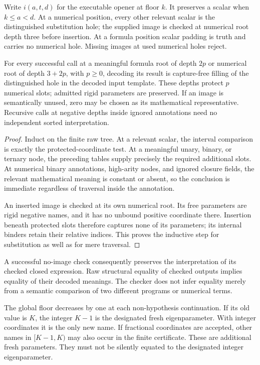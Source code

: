 Write $i(a,t,d)$ for the executable opener at floor $k$.  It preserves a
scalar when $k\leq a<d$.  At a numerical position, every other relevant
scalar is the distinguished substitution hole; the supplied image is
checked at numerical root depth three before insertion.  At a formula
position scalar padding is truth and carries no numerical hole.
Missing images at used numerical holes reject.

\begin{lemma}
\label{lem:semantic-opening}
For every successful call at a meaningful formula root of depth $2p$
or numerical root of depth $3+2p$, with $p\geq0$, decoding its result
is capture-free filling of the distinguished hole in the decoded input
template.  These depths protect $p$ numerical slots; admitted rigid
parameters are preserved.  If an image is semantically unused, zero
may be chosen as its mathematical representative.  Recursive calls
at negative depths inside ignored annotations need no independent
sorted interpretation.
\end{lemma}

\begin{proof}
Induct on the finite raw tree.  At a relevant scalar, the interval
comparison is exactly the protected-coordinate test.  At a meaningful
unary, binary, or ternary node, the preceding tables supply precisely
the required additional slots.  At numerical binary annotations,
high-arity nodes, and ignored closure fields, the relevant mathematical
meaning is constant or absent, so the conclusion is immediate
regardless of traversal inside the annotation.

An inserted image is checked at its own numerical root.  Its free
parameters are rigid negative names, and it has no unbound positive
coordinate there.  Insertion beneath protected slots therefore captures
none of its parameters; its internal binders retain their relative
indices.  This proves the inductive step for substitution as well as
for mere traversal.
\end{proof}

A successful no-image check consequently preserves the interpretation
of its checked closed expression.  Raw structural equality of checked
outputs implies equality of their decoded meanings.  The checker does
not infer equality merely from a semantic comparison of two different
programs or numerical terms.

The global floor decreases by one at each non-hypothesis continuation.
If its old value is $K$, the integer $K-1$ is the designated fresh
eigenparameter.  With integer coordinates it is the only new name.
If fractional coordinates are accepted, other names in $[K-1,K)$ may
also occur in the finite certificate.  These are additional fresh
parameters.  They must not be silently equated to the designated
integer eigenparameter.

